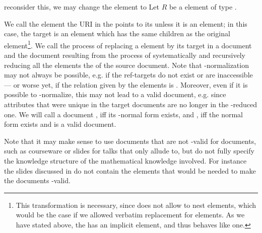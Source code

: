 \begin{omgroup}[id=omdoc-infrastructure,short=Document Infrastructure]
\begin{module}[id=sharing]
\begin{omgroup}[id=sharing,short=Sharing Document Parts]
\begin{oldpart}{reconsider this, we may change the {} element to
    {}}
  Let $R$ be a {} element of type {}.
  \begin{definition}[display=flow,id=ref-target.def]
    We call the element the URI in the {} points to its
    {} unless it is an {} element; in this case,
    the target is an {} element which has the same children as the original
    {} element\footnote{This transformation is necessary, since {\omdoc}
      does not allow to nest {} elements, which would be the case if we
      allowed verbatim replacement for {} elements. As we have stated
      above, the {} has an implicit {} element, and thus
      behaves like one.}.  We call the process of replacing a {} element by
    its target in a document {} and the document resulting from
    the process of systematically and recursively reducing all the {}
    elements the {} of the source document. Note that
    {}-normalization may not always be possible, e.g.  if the ref-targets do
    not exist or are inaccessible --- or worse yet, if the relation given by the
    {} elements is {}. Moreover, even if it is possible to
    {}-normalize, this may not lead to a valid {\omdoc} document, e.g.  since
     attributes that were unique in the target
    documents are no longer in the {}-reduced one. We will call a document
    {}, iff its {}-normal form exists, and
    {}, iff the {} normal form exists and is a valid
    {\omdoc} document.
  \end{definition}
\end{oldpart}
  
Note that it may make sense to use documents that are not {}-valid for
{} documents, such as courseware or slides for talks that
only allude to, but do not fully specify the knowledge structure of the mathematical
knowledge involved. For instance the slides discussed in {}
do not contain the {} elements that would be needed to make the documents
{}-valid.


\end{omgroup}
\end{module}
\end{omgroup}
